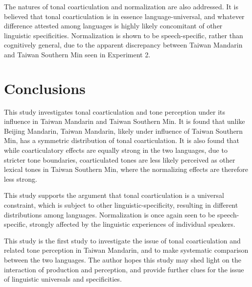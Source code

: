 \documentclass[12pt]{report}
\begin{document}
\begin{CJK}{UTF8}{bsmi}
The natures of tonal coarticulation and normalization are also addressed. It is believed that tonal coarticulation is in essence language-universal, and whatever difference attested among languages is highly likely concomitant of other linguistic specificities. Normalization is shown to be speech-specific, rather than cognitively general, due to the apparent discrepancy between Taiwan Mandarin and Taiwan Southern Min seen in Experiment 2.

\pagebreak
\chapter{Conclusions}

This study investigates tonal coarticulation and tone perception under its influence in Taiwan Mandarin and Taiwan Southern Min. It is found that unlike Beijing Mandarin, Taiwan Mandarin, likely under influence of Taiwan Southern Min, has a symmetric distribution of tonal coarticulation. It is also found that while coarticulatory effects are equally strong in the two languages, due to stricter tone boundaries, coarticulated tones are less likely perceived as other lexical tones in Taiwan Southern Min, where the normalizing effects are therefore less strong.

This study supports the argument that tonal coarticulation is a universal constraint, which is subject to other linguistic-specificity, resulting in different distributions among languages. Normalization is once again seen to be speech-specific, strongly affected by the linguistic experiences of individual speakers.

This study is the first study to investigate the issue of tonal coarticulation and related tone perception in Taiwan Mandarin, and to make systematic comparison between the two languages. The author hopes this study may shed light on the interaction of production and perception, and provide further clues for the issue of linguistic universals and specificities. 


\pagebreak




\pagebreak
\appendix




\end{CJK}
\end{document}

